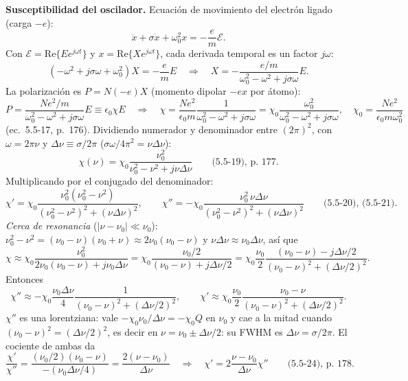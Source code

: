  \textbf{Susceptibilidad del oscilador.} Ecuación de movimiento del electrón ligado (carga $-e$):
\[
\ddot x+\sigma\dot x+\omega_0^2x=-\frac{e}{m}\mathcal E .
\]
Con $\mathcal E=\mathrm{Re}\{Ee^{j\omega t}\}$ y $x=\mathrm{Re}\{Xe^{j\omega t}\}$, cada derivada temporal
es un factor $j\omega$:
\[
(-\omega^2+j\sigma\omega+\omega_0^2)X=-\frac{e}{m}E
\quad\Longrightarrow\quad
X=-\frac{e/m}{\omega_0^2-\omega^2+j\sigma\omega}E .
\]
La polarización es $P=N(-e)X$ (momento dipolar $-ex$ por átomo):
\[
P=\frac{Ne^2/m}{\omega_0^2-\omega^2+j\sigma\omega}E\equiv\epsilon_0\chi E
\quad\Longrightarrow\quad
\chi=\frac{Ne^2}{\epsilon_0m}\frac{1}{\omega_0^2-\omega^2+j\sigma\omega}
=\chi_0\frac{\omega_0^2}{\omega_0^2-\omega^2+j\sigma\omega},\quad \chi_0=\frac{Ne^2}{\epsilon_0m\omega_0^2}
\]
(ec.~5.5-17, p.~176). Dividiendo numerador y denominador entre $(2\pi)^2$, con $\omega=2\pi\nu$ y
$\Delta\nu\equiv\sigma/2\pi$ ($\sigma\omega/4\pi^2=\nu\Delta\nu$):
\[
\chi(\nu)=\chi_0\frac{\nu_0^2}{\nu_0^2-\nu^2+j\nu\Delta\nu}\qquad\text{(5.5-19), p.~177.}
\]
Multiplicando por el conjugado del denominador:
\[
\chi'=\chi_0\frac{\nu_0^2(\nu_0^2-\nu^2)}{(\nu_0^2-\nu^2)^2+(\nu\Delta\nu)^2},\qquad
\chi''=-\chi_0\frac{\nu_0^2\,\nu\Delta\nu}{(\nu_0^2-\nu^2)^2+(\nu\Delta\nu)^2}\qquad\text{(5.5-20), (5.5-21).}
\]
\emph{Cerca de resonancia} ($|\nu-\nu_0|\ll\nu_0$): $\nu_0^2-\nu^2=(\nu_0-\nu)(\nu_0+\nu)\approx2\nu_0(\nu_0-\nu)$
y $\nu\Delta\nu\approx\nu_0\Delta\nu$, así que
\[
\chi\approx\chi_0\frac{\nu_0^2}{2\nu_0(\nu_0-\nu)+j\nu_0\Delta\nu}=\chi_0\frac{\nu_0/2}{(\nu_0-\nu)+j\Delta\nu/2}
=\chi_0\frac{\nu_0}{2}\frac{(\nu_0-\nu)-j\Delta\nu/2}{(\nu_0-\nu)^2+(\Delta\nu/2)^2}.
\]
Entonces
\[
\chi''\approx-\chi_0\frac{\nu_0\Delta\nu}{4}\frac{1}{(\nu_0-\nu)^2+(\Delta\nu/2)^2},\qquad
\chi'\approx\chi_0\frac{\nu_0}{2}\frac{\nu_0-\nu}{(\nu_0-\nu)^2+(\Delta\nu/2)^2}.
\]
$\chi''$ es una lorentziana: vale $-\chi_0\nu_0/\Delta\nu=-\chi_0Q$ en $\nu_0$ y cae a la mitad cuando
$(\nu_0-\nu)^2=(\Delta\nu/2)^2$, es decir en $\nu=\nu_0\pm\Delta\nu/2$: su FWHM es $\Delta\nu=\sigma/2\pi$.
El cociente de ambas da
\[
\frac{\chi'}{\chi''}=\frac{(\nu_0/2)(\nu_0-\nu)}{-(\nu_0\Delta\nu/4)}=\frac{2(\nu-\nu_0)}{\Delta\nu}
\quad\Longrightarrow\quad
\chi'=2\frac{\nu-\nu_0}{\Delta\nu}\chi''\qquad\text{(5.5-24), p.~178.}
\]

